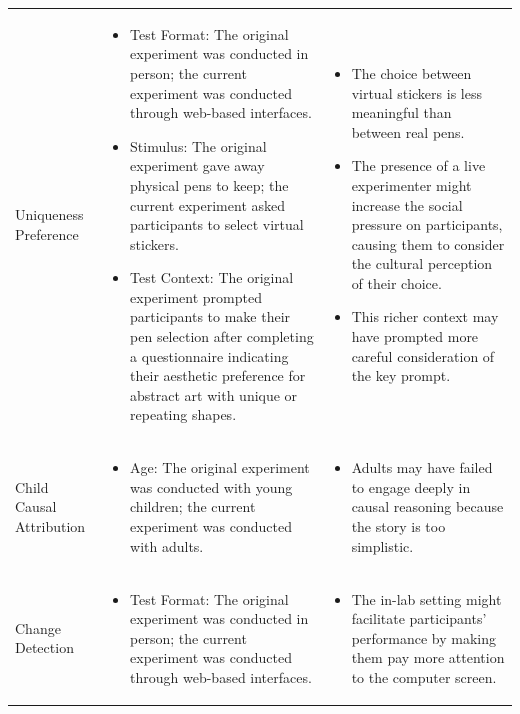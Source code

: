 \documentclass[
  man,floatsintext]{apa6}
\begin{document}
\begin{landscape}
\begin{longtable}{p{3cm}p{10cm}p{8cm}}
Uniqueness Preference & 
    \begin{itemize}
        \item Test Format: The original experiment was conducted in person; the current experiment was conducted through web-based interfaces.
        \item Stimulus: The original experiment gave away physical pens to keep; the current experiment asked participants to select virtual stickers.
        \item Test Context: The original experiment prompted participants to make their pen selection after completing a questionnaire indicating their aesthetic preference for abstract art with unique or repeating shapes.
    \end{itemize}   & 
    \begin{itemize}
        \item The choice between virtual stickers is less meaningful than between real pens.
        \item The presence of a live experimenter might increase the social pressure on participants, causing them to consider the cultural perception of their choice.
        \item This richer context may have prompted more careful consideration of the key prompt.
    \end{itemize} \\

Child Causal Attribution & 
    \begin{itemize}
        \item Age: The original experiment was conducted with young children; the current experiment was conducted with adults.
    \end{itemize}
& \begin{itemize}
    \item Adults may have failed to engage deeply in causal reasoning because the story is too simplistic.
\end{itemize} \\

Change Detection & 
\begin{itemize}
    \item Test Format: The original experiment was conducted in person; the current experiment was conducted through web-based interfaces.
\end{itemize} & 
\begin{itemize}
    \item The in-lab setting might facilitate participants’ performance by making them pay more attention to the computer screen. 
\end{itemize}\\

    \hline
    \end{longtable}


\end{landscape}
\end{document}
